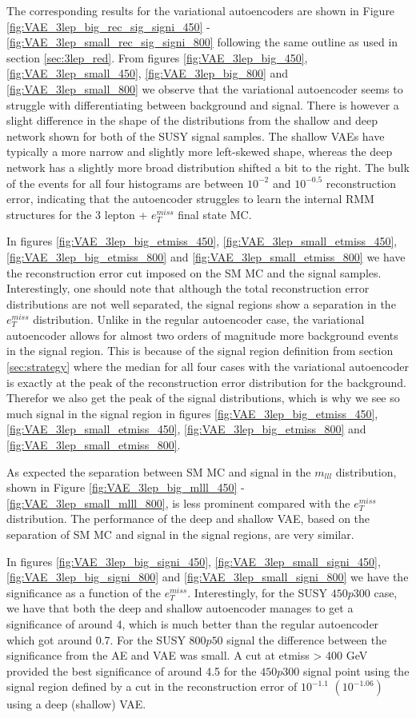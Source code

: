 The corresponding results for the variational autoencoders are shown in 
Figure \ref{fig:VAE_3lep_big_rec_sig_signi_450} - \ref{fig:VAE_3lep_small_rec_sig_signi_800} 
following the same outline as used in section \ref{sec:3lep_red}.
From figures \ref{fig:VAE_3lep_big_450}, \ref{fig:VAE_3lep_small_450},
\ref{fig:VAE_3lep_big_800} and \ref{fig:VAE_3lep_small_800} we observe that the variational 
autoencoder seems to struggle with differentiating between background and signal. 
There is however a slight difference in the shape of the distributions from the shallow and 
deep network shown for both of the SUSY signal samples. The shallow VAEs have typically a more narrow and slightly more 
left-skewed shape, whereas the deep network has a slightly more broad distribution shifted a 
bit to the right. The bulk of the events for all four histograms are between $10^{-2}$ and $10^{-0.5}$ 
reconstruction error, indicating that the autoencoder struggles to learn the internal RMM 
structures for the 3 lepton + $e_T^{miss}$ final state MC. \par 
In figures \ref{fig:VAE_3lep_big_etmiss_450}, \ref{fig:VAE_3lep_small_etmiss_450}, 
\ref{fig:VAE_3lep_big_etmiss_800} and  \ref{fig:VAE_3lep_small_etmiss_800} we have the 
reconstruction error cut imposed on the SM MC and the signal samples. Interestingly, one should 
note that although the total reconstruction error distributions are not well separated, the 
signal regions show a separation in the $e_T^{miss}$ distribution. Unlike in the regular autoencoder 
case, the variational autoencoder allows for almost two orders of magnitude more background 
events in the signal region. This is because of the signal region definition from section 
\ref{sec:strategy} where the median for all four cases with the variational autoencoder is exactly at the peak of the 
reconstruction error distribution for the background. Therefor we also get the peak of 
the signal distributions, which is why we see so much signal in the signal region in figures 
\ref{fig:VAE_3lep_big_etmiss_450}, \ref{fig:VAE_3lep_small_etmiss_450}, 
\ref{fig:VAE_3lep_big_etmiss_800} and \ref{fig:VAE_3lep_small_etmiss_800}. \par 
As expected the separation between SM MC and signal in the $m_{lll}$ distribution, shown in 
Figure \ref{fig:VAE_3lep_big_mlll_450} -  \ref{fig:VAE_3lep_small_mlll_800},
is less prominent compared with the $e_T^{miss}$ distribution. The performance of the deep and shallow VAE, 
based on the separation of SM MC and signal in the signal regions,  are very similar.\par 
In figures \ref{fig:VAE_3lep_big_signi_450}, \ref{fig:VAE_3lep_small_signi_450}, \ref{fig:VAE_3lep_big_signi_800} and  
\ref{fig:VAE_3lep_small_signi_800} we have the significance as a function of the $e_T^{miss}$.
Interestingly, for the SUSY $450p300$ case, we have that both the deep and shallow 
autoencoder manages to get a significance of around 4, which is much better than the 
regular autoencoder which got around 0.7. For the SUSY $800p50$ signal the difference between the significance 
from the AE and VAE was small. A cut at etmiss > 400 GeV provided the best significance of around 4.5 for the $450p300$ 
signal point using the signal region defined by a cut in the reconstruction error of $10^{-1.1}$ $(10^{-1.06})$ 
using a deep (shallow) VAE.
